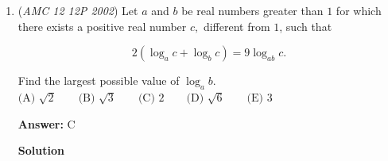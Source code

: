 \begin{enumerate}
 Therefore, $f(2) = \frac{1003+2997}{2} = \boxed {\textbf{(B) }2000}$.

 \textbf{Note} We can find a closed form expression for $f$ using this method. We have that 
 \[f(x) + 2f(\frac{2002}{x}) = 3x\] and plugging in $\frac{2002}{x}$ gives 
 \[f(\frac{2002}{x}) + 2f(x) = 3(\frac{2002}{x}).\]

 Let $a = f(x)$ and $b = f(\frac{2002}{x})$. Then, we have 
 \[a + 2b = 3x \tag{1}\] and 
 \[2a + b = \frac{6006}{x} \tag{2}\]

 We add equations $(1)$ and $(2)$ and divide by $3$ to get $a+b = x + \frac{2002}{x}$. Subtracting this from equation $(2)$ gives us the closed form 
 \[f(x) = \frac{4004}{x} - x\]

 Indeed, plugging in $x=2$ gives us $f(2) = \frac{4004}{2} - 2 = \boxed {\textbf{(B) }2000}$.

 



\textbf{Solution 2(Similar to Sol 1)}

Setting $x = 2$ in the given equation yields
 \[f(2) + 2f(1001) = 6.\]Setting $x = 1001$ gives
 \[2f(2) + f(1001) = 3003.\]

 Adding these two equations and dividing by $3$ results in
 \[f(2) + f(1001) = \frac{6 + 3003}{3} = 1003.\]

 We now have the system:\begin{align*}f(2) + f(1001) &= 1003 \\2f(2) + f(1001) &= 3003\end{align*}


 Subtracting the first equation from the second gives
 \[f(2) = 3003 - 1003 = 2000.\]

 Thus, $f(2) = \boxed{\textbf{(B) }2000}$.

 


	\item (\textit{AMC 12 12P 2002}) Let $a$ and $b$ be real numbers greater than $1$ for which there exists a positive real number $c,$ different from $1$, such that


 
 \[2(\log_a{c} + \log_b{c}) = 9\log_{ab}{c}.\]


 Find the largest possible value of $\log_a b.$
$\text{(A) }\sqrt{2} \qquad \text{(B) }\sqrt{3} \qquad \text{(C) }2 \qquad \text{(D) }\sqrt{6} \qquad \text{(E) }3$

 \textbf{Answer: }C



\textbf{Solution}


\end{enumerate}
